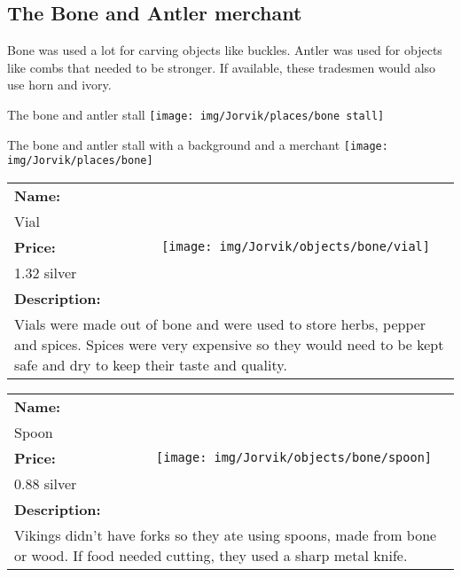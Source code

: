 

\clearpage
\subsection{The  Bone and Antler merchant}
\label{sec:appendix:moj:bone}

Bone was used a lot for carving objects like buckles. Antler was used for objects like combs that needed to be stronger. If available, these tradesmen would also use horn and ivory.

\begin{display}{The  bone and antler stall}
	\label{fig:appendix:moj:places:bone:stall}
	\texttt{[image: img/Jorvik/places/bone stall]}
\end{display}

\begin{display}{The  bone and antler stall with a background and a merchant}
	\label{fig:appendix:moj:places:bone}
	\texttt{[image: img/Jorvik/places/bone]}
\end{display}
\clearpage


\begin{table}[ht!]
	\centering
	\begin{tabular}{ p{3cm} c }\toprule
		\textbf{Name:} & \multirow{5}{*}{\texttt{[image: img/Jorvik/objects/bone/vial]}}\\
		Vial & \\ 
		\textbf{Price:} & \\
		1.32 silver & \\ 
		\textbf{Description:} & \\
		\multicolumn{2}{p{12cm}}{Vials were made out of bone and were used to store herbs, pepper and spices. Spices were very expensive so they would need to be kept safe and dry to keep their taste and quality.}\\
		\bottomrule
	\end{tabular}
\end{table}

\begin{table}[ht!]
	\centering
	\begin{tabular}{ p{3cm} c }\toprule
		\textbf{Name:} & \multirow{5}{*}{\texttt{[image: img/Jorvik/objects/bone/spoon]}}\\
		Spoon & \\ 
		\textbf{Price:} & \\
		0.88 silver & \\ 
		\textbf{Description:} & \\
		\multicolumn{2}{p{12cm}}{Vikings didn't have forks so they ate using spoons, made from bone or wood. If food needed cutting, they used a sharp metal knife.}\\
		\bottomrule
	\end{tabular}
\end{table}

